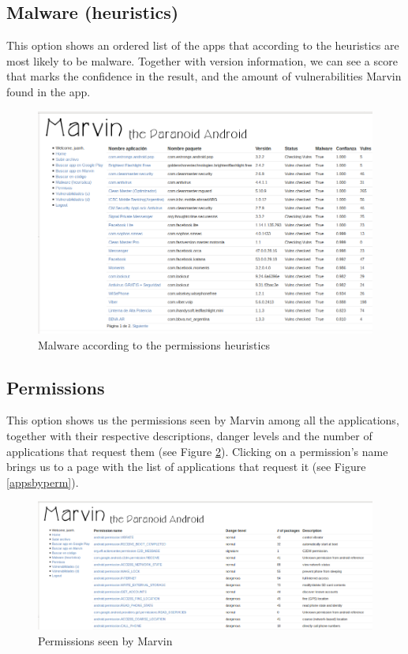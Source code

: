 \documentclass[11pt]{article}
\begin{document}
\subsection{Malware (heuristics)}
This option shows an ordered list of the apps that according to the heuristics are most likely to be malware. Together with version information, we can see a score that marks the confidence in the result, and the amount of vulnerabilities Marvin found in the app.
\begin{figure}[H]
\begin{center}
\includegraphics[width=\textwidth]{graphics/marvin_bayesboys.png}
\caption{Malware according to the permissions heuristics} \label{bayes}
\end{center}
\end{figure}
\subsection{Permissions}\label{permissions}
This option shows us the permissions seen by Marvin among all the applications, together with their respective descriptions, danger levels and the number of applications that request them (see Figure \ref{perms}). Clicking on a permission's name brings us to a page with the list of applications that request it (see Figure \ref{appsbyperm}).
\begin{figure}[H]
\begin{center}
\includegraphics[width=\textwidth]{graphics/marvin_permissions.png}
\caption{Permissions seen by Marvin} \label{perms}
\end{center}
\end{figure}
\end{document}
